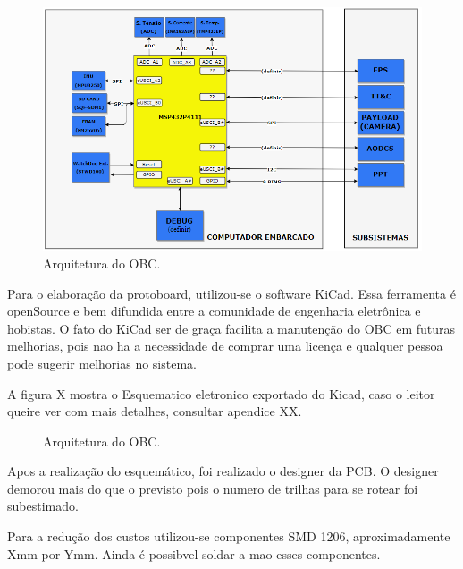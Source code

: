 \begin{figure}[h]
	\centering
	\includegraphics[keepaspectratio=true,scale=0.78]{figuras/arquiteturaHard2.PNG}
	\caption{Arquitetura do OBC.}
	\label{arquiteturaOBC}
\end{figure}

\newpage
Para o elaboração da protoboard, utilizou-se o software KiCad. Essa ferramenta é openSource e bem difundida entre a comunidade de engenharia eletrônica e hobistas. O fato do KiCad ser de graça facilita a manutenção do OBC em futuras melhorias, pois nao ha a necessidade de comprar uma licença e qualquer pessoa pode sugerir melhorias no sistema.

A figura X mostra o Esquematico eletronico exportado do Kicad, caso o leitor queire ver com mais detalhes, consultar apendice XX.

\begin{figure}[h]
	\centering
	
	\caption{Arquitetura do OBC.}
	\label{arquiteturaOBC}
\end{figure}

\newpage

Apos a realização do esquemático, foi realizado o designer da PCB. O designer demorou mais do que o previsto pois o numero de trilhas para se rotear foi subestimado. 

Para a redução dos custos utilizou-se componentes SMD 1206, aproximadamente Xmm por Ymm. Ainda é possibvel soldar a mao esses componentes.

